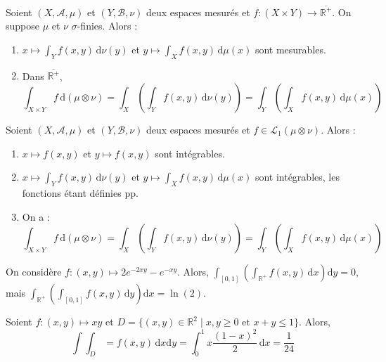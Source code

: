 
	\begin{theorem}
		Soient $(X, \mathcal{A}, \mu)$ et $(Y, \mathcal{B}, \nu)$ deux espaces mesurés et $f : (X \times Y) \rightarrow \overline{\mathbb{R}^+}$. On suppose $\mu$ et $\nu$ $\sigma$-finies. Alors :
		\begin{enumerate}[label=(\roman*)]
			\item $x \mapsto \int_Y f(x,y) \, \mathrm{d}\nu(y)$ et $y \mapsto \int_X f(x,y) \, \mathrm{d}\mu(x)$ sont mesurables.
			\item Dans $\overline{\mathbb{R}^+}$,
			\[ \int_{X \times Y} f \, \mathrm{d}(\mu \otimes \nu) = \int_X \left( \int_Y f(x,y) \, \mathrm{d}\nu(y) \right) = \int_Y \left( \int_X f(x,y) \, \mathrm{d}\mu(x) \right) \]
		\end{enumerate}
	\end{theorem}

	\begin{theorem}
		Soient $(X, \mathcal{A}, \mu)$ et $(Y, \mathcal{B}, \nu)$ deux espaces mesurés et $f \in \mathcal{L}_1 (\mu \otimes \nu)$. Alors :
		\begin{enumerate}[label=(\roman*)]
			\item $x \mapsto f(x,y)$ et $y \mapsto f(x,y)$ sont intégrables.
			\item $x \mapsto \int_Y f(x,y) \, \mathrm{d}\nu(y)$ et $y \mapsto \int_X f(x,y) \, \mathrm{d}\mu(x)$ sont intégrables, les fonctions étant définies pp.
			\item On a :
			\[ \int_{X \times Y} f \, \mathrm{d}(\mu \otimes \nu) = \int_X \left( \int_Y f(x,y) \, \mathrm{d}\nu(y) \right) = \int_Y \left( \int_X f(x,y) \, \mathrm{d}\mu(x) \right) \]
		\end{enumerate}
	\end{theorem}

	\begin{cexample}
		On considère $f : (x,y) \mapsto 2e^{-2xy} - e^{-xy}$. Alors, $\int_{[0,1]} \left( \int_{\mathbb{R}^+} f(x,y) \, \mathrm{d}x \right) \mathrm{d}y = 0$, mais $\int_{\mathbb{R}^+} \left( \int_{[0,1]} f(x,y) \, \mathrm{d}y \right) \mathrm{d}x = \ln(2)$.
	\end{cexample}


	\begin{example}
		Soient $f : (x,y) \mapsto xy$ et $D = \{ (x,y) \in \mathbb{R}^2 \mid x, y \geq 0 \text{ et } x + y \leq 1 \}$. Alors,
		\[ \int \int_D = f(x,y) \, \mathrm{d}x \mathrm{d}y = \int_0^1 x \frac{(1-x)^2}{2} \, \mathrm{d}x = \frac{1}{24} \]
	\end{example}

